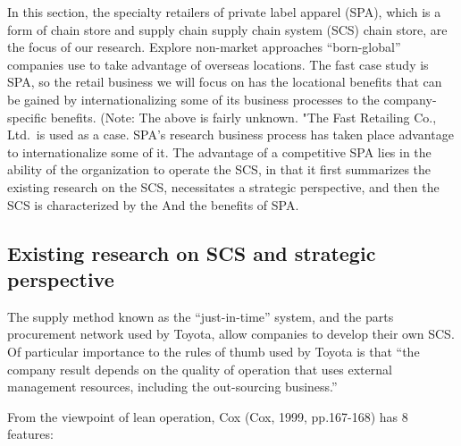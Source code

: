 \documentclass[]{article}
\begin{document}
In this section, the specialty retailers of private label apparel (SPA),
which is a form of chain store and supply chain supply chain system
(SCS) chain store, are the focus of our research. Explore non-market
approaches ``born-global'' companies use to take advantage of overseas
locations. The fast case study is SPA, so the retail business we will
focus on has the locational benefits that can be gained by
internationalizing some of its business processes to the
company-specific benefits. (Note: The above is fairly unknown. "The Fast
Retailing Co., Ltd.~is used as a case. SPA's research business process
has taken place advantage to internationalize some of it. The advantage
of a competitive SPA lies in the ability of the organization to operate
the SCS, in that it first summarizes the existing research on the SCS,
necessitates a strategic perspective, and then the SCS is characterized
by the And the benefits of SPA.

\hypertarget{existing-research-on-scs-and-strategic-perspective}{%
\subsection{Existing research on SCS and strategic
perspective}\label{existing-research-on-scs-and-strategic-perspective}}

The supply method known as the ``just-in-time'' system, and the parts
procurement network used by Toyota, allow companies to develop their own
SCS. Of particular importance to the rules of thumb used by Toyota is
that ``the company result depends on the quality of operation that uses
external management resources, including the out-sourcing business.''

From the viewpoint of lean operation, Cox (Cox, 1999, pp.167-168) has 8
features:
\end{document}
